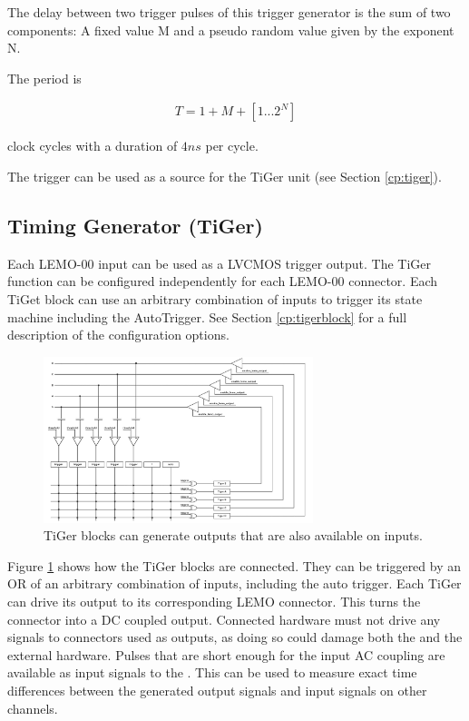 		The delay between two trigger pulses of this trigger generator is the sum of two components: A fixed value M and a pseudo random value given by the exponent N. \par

		The period is

		\begin{align}
			T = 1 + M + [1...2^N]
		\end{align}

		clock cycles with a duration of $4 ns$ per cycle.\par
		
		The trigger can be used as a source for the TiGer unit (see Section \ref{cp:tiger}).
	
	
	\subsection{Timing Generator (TiGer)\label{cp:tiger}}
		Each LEMO-00 input can be used as a LVCMOS trigger output. The TiGer function can be configured independently for each LEMO-00 connector. 
		Each TiGet block can use an arbitrary combination of inputs to trigger its state machine including the AutoTrigger.
		See Section \ref{cp:tigerblock} for a full description of the configuration options.

		\begin{figure}[ht]
			\begin{center}
				\includegraphics[width=0.7\textwidth]{figures/xTDC4_tiger_matrix.pdf}
				\caption{TiGer blocks can generate outputs that are also available on inputs.\label{fig:matrix}}
			\end{center}
		\end{figure}

		Figure \ref{fig:matrix} shows how the TiGer blocks are connected. They can be triggered by an OR of an arbitrary combination of inputs, 
		including the auto trigger. Each TiGer can drive its output to its corresponding LEMO connector. This turns the connector into a DC coupled output. 
		Connected hardware must not drive any signals to connectors used as outputs, as doing so could damage both the \deviceName and the external hardware.
		Pulses that are short enough for the input AC coupling are available as input signals to the \deviceName. 
		This can be used to measure exact time differences between the generated output signals and input signals on other channels.


